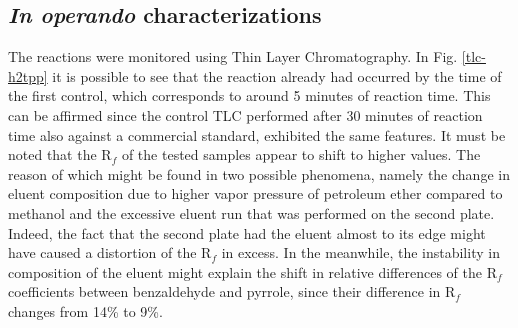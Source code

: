 \documentclass[num-refs]{wiley-article}
\begin{document}
\subsection{\textit{In operando} characterizations}
The reactions were monitored using Thin Layer Chromatography.
In Fig. \ref{tlc-h2tpp} it is possible to see that the reaction already had occurred by the time of the first control, which corresponds to around 5 minutes of reaction time.
This can be affirmed since the control TLC performed after 30 minutes of reaction time also against a commercial standard, exhibited the same features.
It must be noted that the R$_{f}$ of the tested samples appear to shift to higher values.
The reason of which might be found in two possible phenomena, namely the change in eluent composition due to higher vapor pressure of petroleum ether compared to methanol and the excessive eluent run that was performed on the second plate.
Indeed, the fact that the second plate had the eluent almost to its edge might have caused a distortion of the R$_{f}$ in excess.
In the meanwhile, the instability in composition of the eluent might explain the shift in relative differences of the R$_{f}$ coefficients between benzaldehyde and pyrrole, since their difference in R$_{f}$ changes from 14\% to 9\%.
\end{document}
